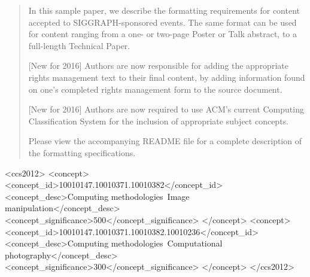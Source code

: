 \documentclass{acmsiggraph}
\begin{document}
\maketitle
\begin{abstract}

In this sample paper, we describe the formatting requirements for
content accepted to SIGGRAPH-sponsored events. The same format can be
used for content ranging from a one- or two-page Poster or Talk abstract, to a
full-length Technical Paper. 

[New for 2016] Authors are now responsible for adding the appropriate rights management
text to their final content, by adding information found on one's completed 
rights management form to the source document.

[New for 2016] Authors are now required to use ACM's current Computing Classification
System for the inclusion of appropriate subject concepts.

Please view the accompanying README file for a complete description of the formatting
specifications.

\end{abstract}

%
%
\begin{CCSXML}
<ccs2012>
<concept>
<concept_id>10010147.10010371.10010382</concept_id>
<concept_desc>Computing methodologies~Image manipulation</concept_desc>
<concept_significance>500</concept_significance>
</concept>
<concept>
<concept_id>10010147.10010371.10010382.10010236</concept_id>
<concept_desc>Computing methodologies~Computational photography</concept_desc>
<concept_significance>300</concept_significance>
</concept>
</ccs2012>
\end{CCSXML}


%
%


\keywordlist

\conceptlist

\printcopyright
\end{document}
